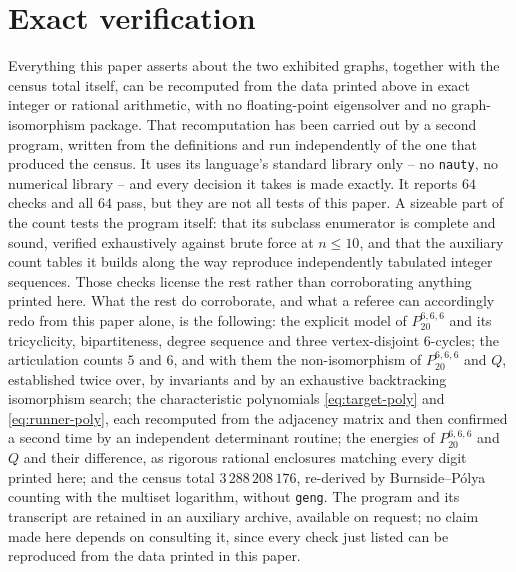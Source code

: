 \documentclass[11pt]{amsart}
\newcommand{\target}{P_{20}^{6,6,6}}
\begin{document}
\section{Exact verification}

Everything this paper asserts about the two exhibited graphs, together
with the census total itself, can be recomputed from the data printed
above in exact integer or rational arithmetic, with no floating-point
eigensolver and no graph-isomorphism package. That recomputation has
been carried out by a second program, written from the definitions and
run independently of the one that produced the census.
It uses its language's standard library only -- no \texttt{nauty}, no
numerical library -- and every decision it takes is made exactly. It
reports $64$ checks and all $64$ pass, but they are not all tests of
this paper. A sizeable part of the count tests the program itself:
that its subclass enumerator is complete and sound, verified
exhaustively against brute force at $n\le10$, and that the auxiliary
count tables it builds along the way reproduce independently tabulated
integer sequences. Those checks license the rest rather than
corroborating anything printed here. What the rest do corroborate, and
what a referee can accordingly redo from this paper alone, is the
following: the explicit model of $\target$ and its
tricyclicity, bipartiteness, degree sequence and three vertex-disjoint
$6$-cycles; the articulation counts $5$ and $6$, and with them the
non-isomorphism of $\target$ and $Q$, established twice over, by
invariants and by an exhaustive backtracking isomorphism search; the
characteristic polynomials
\eqref{eq:target-poly} and \eqref{eq:runner-poly}, each recomputed from
the adjacency matrix and then confirmed a second time by an independent
determinant routine; the energies of $\target$ and $Q$ and their
difference, as rigorous rational enclosures matching every digit
printed here; and the census total $3\,288\,208\,176$, re-derived by
Burnside--P\'olya counting with the multiset logarithm, without
\texttt{geng}. The program and its transcript are retained in an
auxiliary archive, available on request; no claim made here depends on
consulting it, since every check just listed can be reproduced from the
data printed in this paper.
\end{document}
